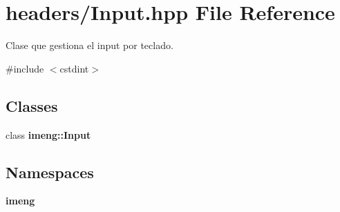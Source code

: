 \section{headers/\+Input.hpp File Reference}
\label{_input_8hpp}


Clase que gestiona el input por teclado.  


{\ttfamily \#include $<$cstdint$>$}\newline
\subsection*{Classes}
\begin{DoxyCompactItemize}
\item 
class \textbf{ imeng\+::\+Input}
\end{DoxyCompactItemize}
\subsection*{Namespaces}
\begin{DoxyCompactItemize}
\item 
 \textbf{ imeng}
\end{DoxyCompactItemize}
